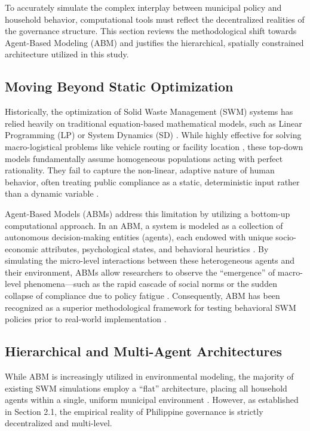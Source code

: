 
To accurately simulate the complex interplay between municipal policy and household behavior, computational tools must reflect the decentralized realities of the governance structure. This section reviews the methodological shift towards Agent-Based Modeling (ABM) and justifies the hierarchical, spatially constrained architecture utilized in this study.

\subsection{Moving Beyond Static Optimization}

Historically, the optimization of Solid Waste Management (SWM) systems has relied heavily on traditional equation-based mathematical models, such as Linear Programming (LP) or System Dynamics (SD) \citep{Zhang2021, Saif2022}. While highly effective for solving macro-logistical problems like vehicle routing or facility location \citep{Akbarpour2021}, these top-down models fundamentally assume homogeneous populations acting with perfect rationality. They fail to capture the non-linear, adaptive nature of human behavior, often treating public compliance as a static, deterministic input rather than a dynamic variable \citep{TianReview2024}.

Agent-Based Models (ABMs) address this limitation by utilizing a bottom-up computational approach. In an ABM, a system is modeled as a collection of autonomous decision-making entities (agents), each endowed with unique socio-economic attributes, psychological states, and behavioral heuristics \citep{Meng2018}. By simulating the micro-level interactions between these heterogeneous agents and their environment, ABMs allow researchers to observe the ``emergence'' of macro-level phenomena—such as the rapid cascade of social norms or the sudden collapse of compliance due to policy fatigue \citep{Ma2023, deSouza2021}. Consequently, ABM has been recognized as a superior methodological framework for testing behavioral SWM policies prior to real-world implementation \citep{TianReview2024}.

\subsection{Hierarchical and Multi-Agent Architectures}

While ABM is increasingly utilized in environmental modeling, the majority of existing SWM simulations employ a ``flat'' architecture, placing all household agents within a single, uniform municipal environment \citep{Ding2024}. However, as established in Section 2.1, the empirical reality of Philippine governance is strictly decentralized and multi-level. 

